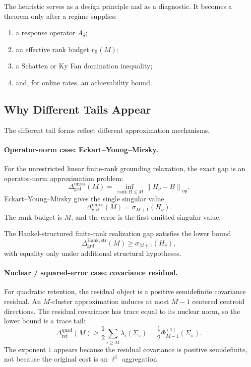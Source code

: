 \documentclass[12pt]{article}
\theoremstyle{definition}
\DeclareMathOperator{\rank}{rank}
\newcommand{\norm}[1]{\left\lVert#1\right\rVert}
\newcommand{\Dunres}{\Delta_{\mathrm{grd}}^{\mathrm{unres}}}
\newcommand{\DHankstr}{\Delta_{\mathrm{grd}}^{\mathrm{Hank,str}}}
\begin{document}
The heuristic serves as a design principle and as a diagnostic.  It becomes a
theorem only after a regime supplies:
\begin{enumerate}[label=(\arabic*)]
\item a response operator $A_\delta$;
\item an effective rank budget $r_{\mathbb T}(M)$;
\item a Schatten or Ky Fan domination inequality;
\item and, for online rates, an achievability bound.
\end{enumerate}

\subsection{Why Different Tails Appear}
\label{subsec:spectral-why}

The different tail forms reflect different approximation mechanisms.

\paragraph{Operator-norm case: Eckart--Young--Mirsky.}
For the unrestricted linear finite-rank grounding relaxation, the exact gap is
an operator-norm approximation problem:
\[
\Dunres(M)
=
\inf_{\rank B\le M}
\norm{H_\nu-B}_{\mathrm{op}}.
\]
Eckart--Young--Mirsky gives the single singular value
\[
\Dunres(M)
=
\sigma_{M+1}(H_\nu).
\]
The rank budget is $M$, and the error is the first omitted singular value.

The Hankel-structured finite-rank realization gap satisfies the lower bound
\[
\DHankstr(M)
\ge
\sigma_{M+1}(H_\nu),
\]
with equality only under additional structural hypotheses.

\paragraph{Nuclear / squared-error case: covariance residual.}
For quadratic retention, the residual object is a positive semidefinite
covariance residual.  An $M$-cluster approximation induces at most $M-1$
centered centroid directions.  The residual covariance has trace equal to its
nuclear norm, so the lower bound is a trace tail:
\[
\Delta_{\mathrm{ret}}^{\mathrm{quad}}(M)
\ge
\frac12
\sum_{i\ge M}
\lambda_i(\Sigma_\pi)
=
\frac12
\Phi^{(1)}_{M-1}(\Sigma_\pi).
\]
The exponent $1$ appears because the residual covariance is positive
semidefinite, not because the original cost is an $\ell^1$ aggregation.
\end{document}
